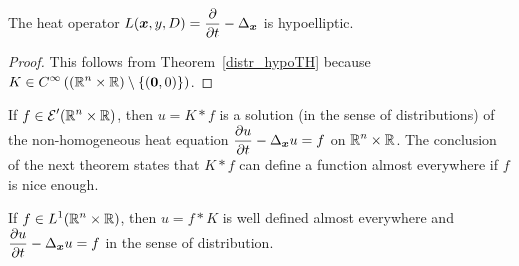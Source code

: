 \begin{cor}
The heat operator
$\displaystyle L({\bm{x}},y,D) = \frac{\partial{}}{\partial t} - \Delta_{{\bm{x}}}$ is hypoelliptic.
\end{cor}

\begin{proof}
This follows from Theorem~\ref{distr_hypoTH} because $\displaystyle K \in
C^\infty\left((\mathbb{R}^n\times \mathbb{R}) \setminus \{ ({\bm{0}},0) \}\right)$.
\end{proof}

If $\displaystyle f \in \mathcal{E}'(\mathbb{R}^n\times \mathbb{R})$, then $u = K\ast f$ is
a solution (in the sense of distributions) of the non-homogeneous heat
equation $\displaystyle \frac{\partial{u}}{\partial t} - \Delta_{{\bm{x}}} u = f$ on
$\displaystyle \mathbb{R}^n\times \mathbb{R}$.
The conclusion of the next theorem states that $K\ast f$ can define a
function almost everywhere if $f$ is nice enough.

\begin{theorem}
If $\displaystyle f \in L^1(\mathbb{R}^n\times \mathbb{R})$, then $u = f\ast K$ is
well defined almost everywhere and
$\displaystyle \frac{\partial{u}}{\partial t} - \Delta_{{\bm{x}}} u = f$ in the sense of
distribution.
\end{theorem}

